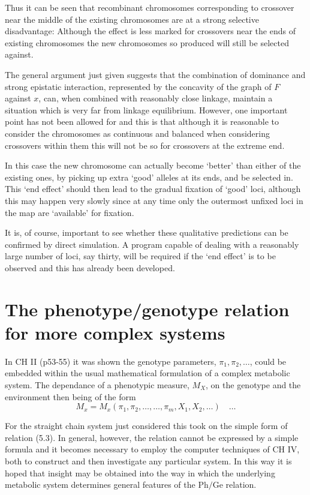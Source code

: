Thus it can be seen that recombinant chromosomes corresponding to crossover near the middle of the existing chromosomes are at a strong selective disadvantage: Although the effect is less marked for crossovers near the ends of existing chromosomes the new chromosomes so produced will still be selected against. 

The general argument just given suggests that the combination of dominance and strong epistatic interaction, represented by the concavity of the graph of $F$ against $x$, can, when combined with reasonably close linkage, maintain a situation which is very far from linkage equilibrium. However, one important point has not been allowed for and this is that although it is reasonable to consider the chromosomes as continuous and balanced when considering crossovers within them this will not be so for crossovers at the extreme end.

In this case the new chromosome can actually become `better' than either of the existing ones, by picking up extra `good' alleles at its ends, and be selected in. This `end effect' should then lead to the gradual fixation of `good' loci, although this may happen very slowly since at any time only the outermost unfixed loci in the map are `available' for fixation.

It is, of course, important to see whether these qualitative predictions can be confirmed by direct simulation. A program capable of dealing with a reasonably large number of loci, say thirty, will be required if the `end effect' is to be observed and this has already been developed.

\section{The phenotype/genotype relation for more complex systems}

In CH II (p53-55) it was shown the genotype parameters, $\pi_1, \pi_2, \ldots$, could be embedded within the usual mathematical formulation of a complex metabolic system. The dependance of a phenotypic measure, $M_X$, on the genotype and the environment then being of the form
%
\begin{equation}
M_x = M_x\left(\pi_1, \pi_2, \ldots, \ldots, \pi_m, X_1, X_2, \ldots\right) \quad \ldots
\label{eqn:518}
\end{equation}

For the straight chain system just considered this took on the simple form of relation (5.3). In general, however, the relation cannot be expressed by a simple formula and it becomes necessary to employ the computer techniques of CH IV, both to construct and then investigate any particular system. In this way it is hoped that insight may be obtained into the way in which the underlying metabolic system determines general features of the $\mathrm{Ph} / \mathrm{Ge}$ relation.

